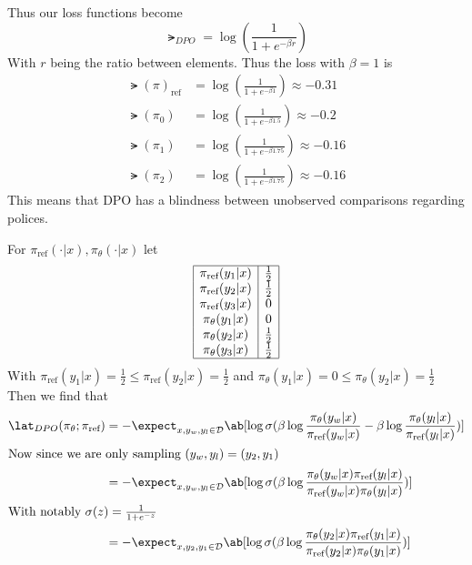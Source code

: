 \documentclass[12pt]{amsart}
\begin{document}
\begin{problem}
\begin{subproblem}
      Thus our loss functions become 
      \[\lat_{DPO}=\log(\frac1{1+e^{-\beta r}})\]
      With $r$ being the ratio between elements. Thus the loss with $\beta=1$ is
      \begin{align*}
        \lat(\pi)_{\text{ref}}&=\log(\frac1{1+e^{-\beta 1}})\approx -0.31\\
        \lat(\pi_0)&=\log(\frac1{1+e^{-\beta 1.5}})\approx -0.2\\
        \lat(\pi_1)&=\log(\frac1{1+e^{-\beta 1.75}})\approx -0.16\\
        \lat(\pi_2)&=\log(\frac1{1+e^{-\beta 1.75}})\approx-0.16
      \end{align*}
      This means that DPO has a blindness between unobserved comparisons regarding polices.
    \end{subproblem}
    \begin{subproblem}
      For $\pi_{\text{ref}}(\cdot|x), \pi_{\theta}(\cdot|x)$ let 
      \[\begin{array}{|c|c|}
        \hline
        \pi_{\text{ref}}(y_1|x) & \frac12\\
        \pi_{\text{ref}}(y_2|x) & \frac12 \\
        \pi_{\text{ref}}(y_3|x) & 0\\
        \pi_{\theta}(y_1|x) & 0\\
        \pi_{\theta}(y_2|x) & \frac12\\
        \pi_{\theta}(y_3|x) & \frac12\\
        \hline
      \end{array}\]
      With $\pi_{\text{ref}}(y_1|x)=\frac12\leq\pi_{\text{ref}}(y_2|x)=\frac12$ and $\pi_{\theta}(y_1|x) = 0\leq \pi_{\theta}(y_2|x) = \frac12$
      Then we find that 
      \begin{align*}
        \lat_{DPO}(\pi_\theta;\pi_{\text{ref}}) &= -\expect_{x,y_w,y_l\in \mathcal{D}}\ab[\log\sigma(\beta\log\frac{\pi_\theta(y_w|x)}{\pi_{\text{ref}}(y_w|x)}-\beta\log\frac{\pi_\theta(y_l|x)}{\pi_{\text{ref}}(y_l|x)})] \\
                                \intertext{Now since we are only sampling $(y_w,y_l)=(y_2,y_1)$}
                                &= -\expect_{x,y_w,y_l\in \mathcal{D}}\ab[\log\sigma(\beta\log\frac{\pi_\theta(y_w|x)\pi_{\text{ref}}(y_l|x)}{\pi_{\text{ref}}(y_w|x)\pi_\theta(y_l|x)})] \\
                                \intertext{With notably $\sigma(z)=\frac1{1+e^{-z}}$}
                                &= -\expect_{x,y_2,y_1\in \mathcal{D}}\ab[\log\sigma(\beta\log\frac{\pi_\theta(y_2|x)\pi_{\text{ref}}(y_1|x)}{\pi_{\text{ref}}(y_2|x)\pi_\theta(y_1|x)})] \\

\end{align*}
\end{subproblem}
\end{problem}
\end{document}
